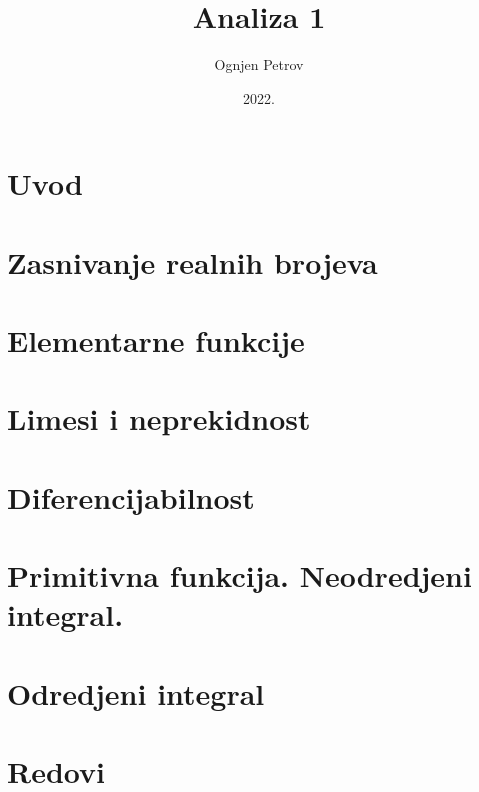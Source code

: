 \documentclass[a4paper,12pt]{book}
\title{\textbf{Analiza 1}}
\author{Ognjen Petrov}
\date{2022.}
\begin{document}
\maketitle

\tableofcontents
\chapter{Uvod}



\chapter{Zasnivanje realnih brojeva}


    
\chapter{Elementarne funkcije}



\chapter{Limesi i neprekidnost}



\chapter{Diferencijabilnost}



\chapter{Primitivna funkcija. Neodredjeni integral.}



\chapter{Odredjeni integral}



\chapter{Redovi}


\end{document}
